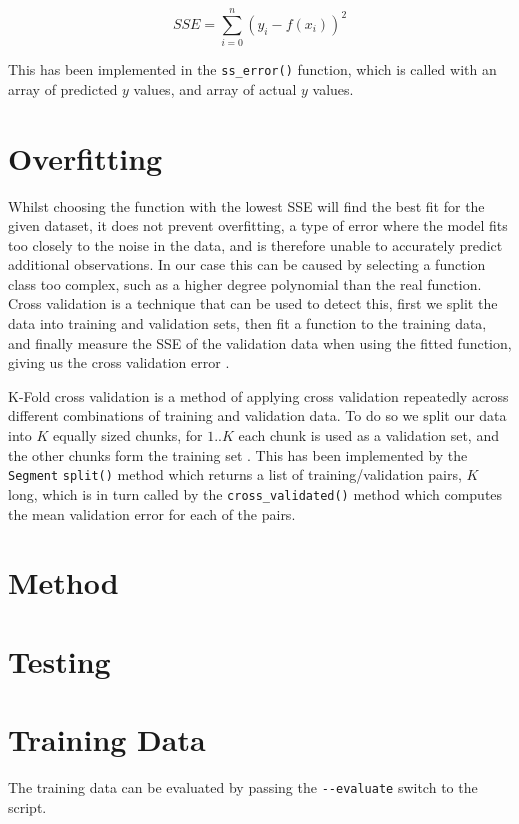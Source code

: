 \documentclass[11pt,a4paper]{scrartcl}
\begin{document}
\[SSE = \sum_{i=0}^{n} ( y_{i} - f(x_{i}) )^{2}\]

This has been implemented in the \lstinline|ss_error()| function, which is called with an array of predicted $y$ values, and array of actual $y$ values.

\section{Overfitting}

Whilst choosing the function with the lowest SSE will find the best fit for the given dataset, it does not prevent overfitting, a type of error where the model fits too closely to the noise in the data, and is therefore unable to accurately predict additional observations. In our case this can be caused by selecting a function class too complex, such as a higher degree polynomial than the real function. Cross validation is a technique that can be used to detect this, first we split the data into training and validation sets, then fit a function to the training data, and finally measure the SSE of the validation data when using the fitted function, giving us the cross validation error \cite{lecture_overfitting}.

K-Fold cross validation is a method of applying cross validation repeatedly across different combinations of training and validation data. To do so we split our data into $K$ equally sized chunks, for $1..K$ each chunk is used as a validation set, and the other chunks form the training set \cite{k_fold_validation}. This has been implemented by the \lstinline|Segment| \lstinline|split()| method which returns a list of training/validation pairs, $K$ long, which is in turn called by the \lstinline|cross_validated()| method which computes the mean validation error for each of the pairs.

\section{Method}

\section{Testing}


\section{Training Data}

The training data can be evaluated by passing the \lstinline|--evaluate| switch to the script.


\printbibliography
\end{document}
